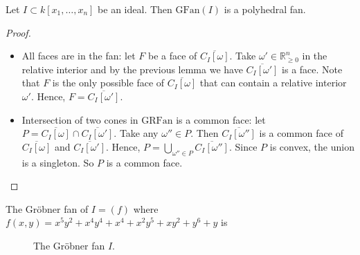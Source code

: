 \documentclass[a4paper, 11pt]{article}
\begin{document}
\begin{mdframed}
  \begin{thm}
    Let \( I \subset k[x_1, \dots, x_n] \) be an ideal. Then \( \mathrm{GFan}(I) \) is a polyhedral fan.
  \end{thm}
\end{mdframed}

\begin{proof}\(  \)
  \begin{itemize}
    \item All faces are in the fan: let \( F \) be a face of \( \overline{C_I[\omega]} \). Take \( \omega' \in \mathbb R^n_{\geq 0} \) in the relative interior and by the previous lemma we have \( \overline{C_I[\omega']} \) is a face. Note that \( F \) is the only possible face of \( \overline{C_I[\omega]} \) that can contain a relative interior \( \omega' \). Hence, \( F = \overline{C_I[\omega']} \).
    \item Intersection of two cones in \( \mathrm{GRFan} \) is a common face: let \( P = \overline{C_I[\omega]} \cap \overline{C_I[\omega']} \). Take any \( \omega'' \in P \). Then \( \overline{C_I[\omega'']} \) is a common face of \( \overline{C_I[\omega]} \) and \( \overline{C_I[\omega']} \). Hence, \( P = \bigcup_{\omega'' \in P} \overline{C_I[\omega'']} \). Since \( P \) is convex, the union is a singleton. So \( P \) is a common face.
  \end{itemize}
\end{proof}

\begin{eg}
  The Gröbner fan of \( I = (f)\) where \(     f(x,y) = x^5y^2 + x^4y^4 + x^4 + x^2y^5 + xy^2 + y^6 + y
 \) is 
  \begin{figure}[H]
    \centering
      \caption{The Gröbner fan \( I \).}
  \end{figure}
\end{eg}
\end{document}
